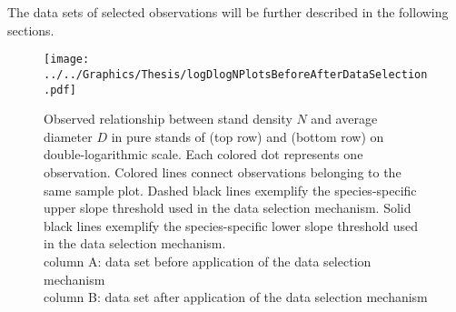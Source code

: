 The data sets of selected observations will be further described in the following sections.



\begin{figure}[H]
  \centering
  \texttt{[image: ../../Graphics/Thesis/logDlogNPlotsBeforeAfterDataSelection.pdf]}
  \caption{Observed relationship between stand density \(N\) and average diameter \(D\) in pure stands of \Beech{} (top row) and \Spruce{} (bottom row) on double-logarithmic scale.  Each colored dot represents one observation.  Colored lines connect observations belonging to the same sample plot.  Dashed black lines exemplify the species-specific upper slope threshold used in the data selection mechanism.  Solid black lines exemplify the species-specific lower slope threshold used in the data selection mechanism.  \\
    column A: data set before application of the data selection mechanism \\
    column B: data set after application of the data selection mechanism}
  \label{fig:logDlogNPlotsBeforeAfterDataSelection}
\end{figure}

